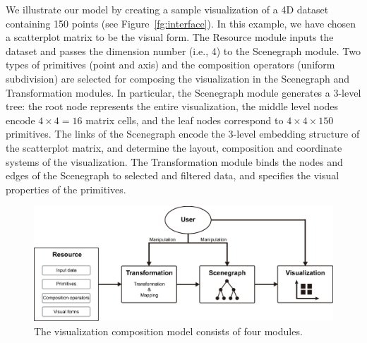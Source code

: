 We illustrate our model by creating a sample visualization of a 4D dataset containing 150 points (see Figure~\ref{fg:interface}).  In this example, we have chosen a scatterplot matrix to be the visual form. The Resource module inputs the dataset and passes the dimension number (i.e., 4) to the Scenegraph module. Two types of primitives (point and axis) and the composition operators (uniform subdivision) are selected for composing the visualization in the Scenegraph and Transformation modules. In particular, the Scenegraph module generates a 3-level tree: the root node represents the entire visualization, the middle level nodes encode $4\times4 =16 $ matrix cells, and the leaf nodes correspond to $4 \times 4 \times 150$ primitives. The links of the Scenegraph encode the 3-level embedding structure of the scatterplot matrix, and determine the layout, composition and coordinate systems of the visualization. The Transformation module binds the nodes and edges of the Scenegraph to selected and filtered data, and specifies the visual properties of the primitives.

\begin{figure}
  \includegraphics[width=0.98\linewidth]{images/compositionModel.eps}
  \caption{The visualization composition model consists of four modules.} \label{fg:model}
\end{figure}
